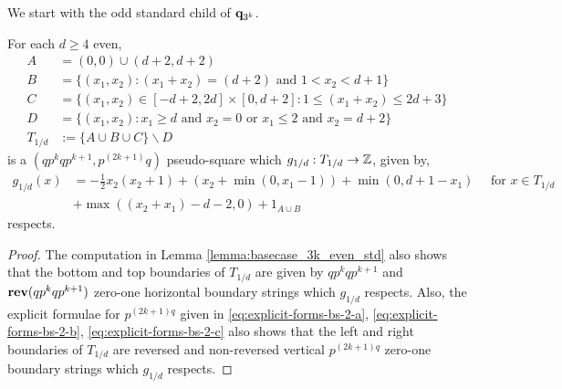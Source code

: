 \documentclass[12pt]{amsart}
\begin{document}
We start with the odd standard child of $\mathbf{q}_{3^k}$. 
\begin{lemma} \label{lemma:basecase_3k_odd_std}
For each $d \geq 4$ even,
\begin{align*}
A &=  (0,0) \cup (d+2,d+2) \\
B &= \{ (x_1, x_2) : (x_1 + x_2) = (d+2) \mbox{ and } 1 < x_2 < d+1\} \\
C &=  \{ (x_1, x_2) \in [-d+2, 2 d] \times [0, d+2] : 1 \leq (x_1 + x_2) \leq 2d + 3\} \\ 
D &= \{ (x_1, x_2) : x_1 \geq d \mbox{ and } x_2 = 0 \mbox{ or } x_1 \leq 2 \mbox{ and } x_2 = d+2 \}  \\
T_{1/d} &:=  \{A \cup B \cup C \} \backslash D
\end{align*}
is a $(q p^k q p^{k+1}, p^{(2k+1)} q)$ pseudo-square which $g_{1/d}: T_{1/d} \to \mathbb{Z}$, given by, 
\[
\begin{aligned}
g_{1/d}(x) &= -\frac{1}{2} x_2 (x_2 + 1) + (x_2 + \min(0, x_1-1)) + \min(0, d+1-x_1) \quad \mbox{ for $x \in T_{1/d}$} \\
&+ \max((x_2+x_1)-d-2,0) + 1_{A \cup B}
\end{aligned}
\]
respects. 
\end{lemma}
\begin{proof}
	The computation in Lemma \ref{lemma:basecase_3k_even_std} also shows that the bottom and top boundaries of $T_{1/d}$ 
	are given by  $q p^k q p^{k+1}$ and $\mathop{\bf rev}(q p^k q p^{k+1})$ zero-one horizontal boundary strings which $g_{1/d}$ respects. Also, the explicit formulae for $p^{(2k+1) q}$ given in \eqref{eq:explicit-forms-bs-2-a}, \eqref{eq:explicit-forms-bs-2-b}, \eqref{eq:explicit-forms-bs-2-c}
	also shows that the left and right boundaries of $T_{1/d}$ are reversed and non-reversed vertical $p^{(2k+1) q}$
	zero-one boundary strings which $g_{1/d}$ respects. 
\end{proof}
\end{document}
